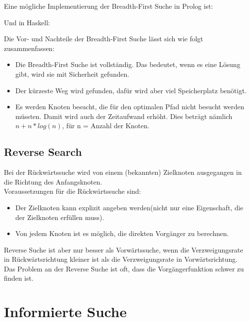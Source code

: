 \documentclass[fleqn]{article}
\numberwithin{equation}{section}
\numberwithin{figure}{section}
\numberwithin{table}{section}
\begin{document}
\bigskip

Eine mögliche Implementierung der Breadth-First Suche in Prolog ist:\\



\bigskip

Und in Haskell:\\



\bigskip

Die Vor- und Nachteile der Breadth-First Suche lässt sich wie folgt zusammenfassen:

\begin{itemize}
  \item Die Breadth-First Suche ist vollständig. Das bedeutet, wenn es eine Lösung gibt, wird sie mit Sicherheit gefunden.
  \item Der kürzeste Weg wird gefunden, dafür wird aber viel Speicherplatz benötigt.
  \item Es werden Knoten besucht, die für den optimalen Pfad nicht besucht werden müssten. Damit wird auch der Zeitaufwand erhöht. Dies beträgt nämlich $n+n*log(n)$, für n = Anzahl der Knoten.
\end{itemize}

\subsection{Reverse Search}
\bigskip
Bei der Rückwärtssuche wird von einem (bekannten) Zielknoten ausgegangen in die Richtung des Anfangsknoten.\\

Voraussetzungen für die Rückwärtssuche sind:

\begin{itemize}
  \item Der Zielknoten kann explizit angeben werden(nicht nur eine Eigenschaft, die der Zielknoten erfüllen muss).
  \item Von jedem Knoten ist es möglich, die direkten Vorgänger zu berechnen.
\end{itemize}

Reverse Suche ist aber nur besser als Vorwärtssuche, wenn die Verzweigungsrate in Rückwärtsrichtung kleiner ist als die Verzweigungsrate in Vorwärtsrichtung. Das Problem an der Reverse Suche ist oft, dass die Vorgängerfunktion schwer zu finden ist.

\section{Informierte Suche}
\end{document}
